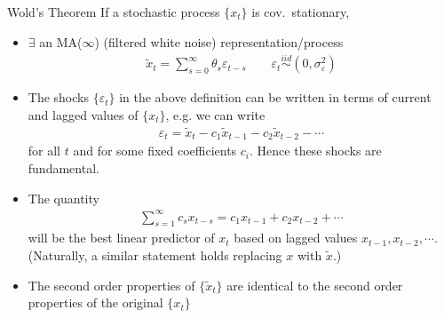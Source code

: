 \documentclass[aspectratio=169, handout]{beamer}
\newcommand{\iid}{\overset{iid}{\sim}}
\begin{document}
{\footnotesize
\begin{frame}{Wold's Theorem}
If a stochastic process $\{x_t\}$ is \alert{cov.\ stationary},
\begin{itemize}
  \item
    \alert{$\exists$} an \alert{MA($\infty$)} (filtered white noise)
    \alert{representation}/\alert{process}
    \begin{align*}
      \tilde{x}_t = \sum_{s=0}^\infty \theta_s\varepsilon_{t-s}
      \qquad
      \varepsilon_t
      \iid (0,\sigma^2_\varepsilon)
    \end{align*}

  \item The shocks $\{\varepsilon_t\}$ in the above definition can
    be written in terms of current and lagged values of
    $\{x_t\}$, e.g. we can write
    \begin{align*}
      \varepsilon_t = \tilde{x}_t - c_1\tilde{x}_{t-1} -
      c_2\tilde{x}_{t-2}-\cdots
    \end{align*}
    for all $t$ and for some fixed coefficients $c_i$.
    Hence these shocks are \alert{fundamental}.

  \item The quantity
    \begin{align*}
      \sum_{s=1}^\infty
      c_s x_{t-s}
      =
      c_1{x}_{t-1}
      + c_2{x}_{t-2}
      + \cdots
    \end{align*}
    will be the \alert{best linear predictor} of $x_t$ based on lagged
    values $x_{t-1},x_{t-2},\cdots$.
    (Naturally, a similar statement holds replacing $x$ with
    $\tilde{x}$.)

  \item The second order properties of $\{\tilde{x}_t\}$ are identical
    to the second order properties of the original $\{x_t\}$
\end{itemize}
\end{frame}
}
\end{document}

